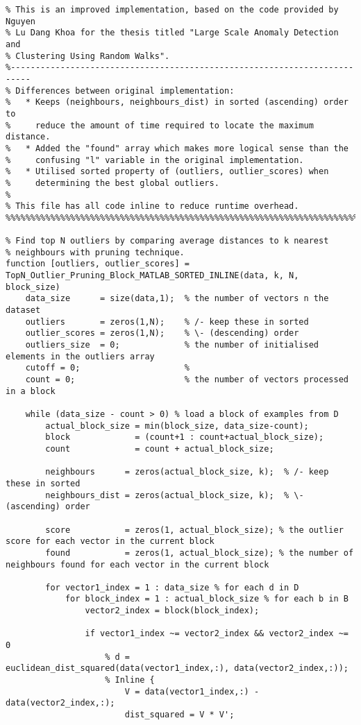 \begin{lstlisting}
% This is an improved implementation, based on the code provided by Nguyen
% Lu Dang Khoa for the thesis titled "Large Scale Anomaly Detection and
% Clustering Using Random Walks".
%--------------------------------------------------------------------------
% Differences between original implementation:
%   * Keeps (neighbours, neighbours_dist) in sorted (ascending) order to
%     reduce the amount of time required to locate the maximum distance.
%   * Added the "found" array which makes more logical sense than the
%     confusing "l" variable in the original implementation.
%   * Utilised sorted property of (outliers, outlier_scores) when
%     determining the best global outliers.
%
% This file has all code inline to reduce runtime overhead.
%%%%%%%%%%%%%%%%%%%%%%%%%%%%%%%%%%%%%%%%%%%%%%%%%%%%%%%%%%%%%%%%%%%%%%%%%%%

% Find top N outliers by comparing average distances to k nearest
% neighbours with pruning technique.
function [outliers, outlier_scores] = TopN_Outlier_Pruning_Block_MATLAB_SORTED_INLINE(data, k, N, block_size)
    data_size      = size(data,1);  % the number of vectors n the dataset
    outliers       = zeros(1,N);    % /- keep these in sorted
    outlier_scores = zeros(1,N);    % \- (descending) order
    outliers_size  = 0;             % the number of initialised elements in the outliers array
    cutoff = 0;                     %
    count = 0;                      % the number of vectors processed in a block

    while (data_size - count > 0) % load a block of examples from D
        actual_block_size = min(block_size, data_size-count);
        block             = (count+1 : count+actual_block_size);
        count             = count + actual_block_size;

        neighbours      = zeros(actual_block_size, k);  % /- keep these in sorted
        neighbours_dist = zeros(actual_block_size, k);  % \- (ascending) order

        score           = zeros(1, actual_block_size); % the outlier score for each vector in the current block
        found           = zeros(1, actual_block_size); % the number of neighbours found for each vector in the current block

        for vector1_index = 1 : data_size % for each d in D
            for block_index = 1 : actual_block_size % for each b in B
                vector2_index = block(block_index);

                if vector1_index ~= vector2_index && vector2_index ~= 0
                    % d = euclidean_dist_squared(data(vector1_index,:), data(vector2_index,:));
                    % Inline {
                        V = data(vector1_index,:) - data(vector2_index,:);
                        dist_squared = V * V';


\end{lstlisting}
